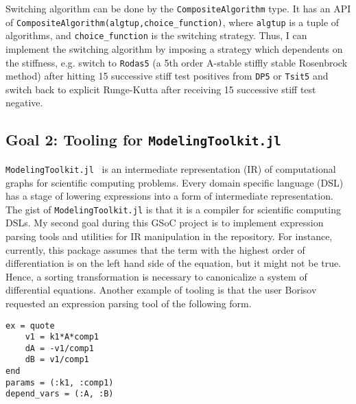 \documentclass[12pt,a4paper]{article}
\begin{document}
Switching algorithm can be done by the \texttt{CompositeAlgorithm} type. It has
an API of \texttt{CompositeAlgorithm(algtup,choice\_function)}, where
\texttt{algtup} is a tuple of algorithms, and \texttt{choice\_function} is the
switching strategy. Thus, I can implement the switching algorithm by imposing a
strategy which dependents on the stiffness, e.g. switch to \texttt{Rodas5} (a
5th order A-stable stiffly stable Rosenbrock method) after hitting 15
successive stiff test positives from \texttt{DP5} or \texttt{Tsit5} and switch
back to explicit Runge-Kutta after receiving 15 successive stiff test negative.

\subsection{Goal 2: Tooling for \texttt{ModelingToolkit.jl}}
\texttt{ModelingToolkit.jl}~\cite{modelingtoolkit} is an intermediate
representation (IR) of computational graphs for scientific computing problems.
Every domain specific language (DSL) has a stage of lowering expressions into a
form of intermediate representation. The gist of \texttt{ModelingToolkit.jl} is
that it is a compiler for scientific computing DSLs. My second goal during this
GSoC project is to implement expression parsing tools and utilities for IR
manipulation in the repository. For instance, currently, this package assumes
that the term with the highest order of differentiation is on the left hand
side of the equation, but it might not be true. Hence, a sorting transformation
is necessary to canonicalize a system of differential equations. Another
example of tooling is that the user Borisov~\cite{parsing} requested an
expression parsing tool of the following form.
\begin{lstlisting}
ex = quote
    v1 = k1*A*comp1
    dA = -v1/comp1
    dB = v1/comp1
end
params = (:k1, :comp1)
depend_vars = (:A, :B)
\end{lstlisting}
\end{document}
